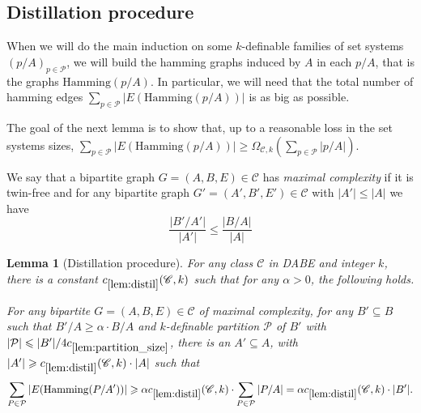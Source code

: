 \documentclass[11pt]{article}
\newtheorem{lemma}{Lemma}
\theoremstyle{definition}
\newcommand{\CC}{{\mathscr C}}
\newcommand{\inducedSS}[2]{#1/#2}%
\renewcommand{\leq}{\leqslant}
\renewcommand{\geq}{\geqslant}
\renewcommand{\ge}{\geqslant}
\newcommand{\Pp}{\mathcal{P}}
\newcommand{\remph}[1]{{\color{red} \emph{#1}}}
\newcommand{\hamming}{\mathrm{Hamming}}
\begin{document}
\subsection{Distillation procedure}
When we will do the main induction on some $k$-definable families of set systems $(\inducedSS{p}{A})_{p \in \Pp}$, we will build the hamming graphs induced by $A$ in each $\inducedSS{p}{A}$, that is the graphs $\hamming(\inducedSS{p}{A})$. In particular, we will need that the total number of hamming edges $\sum_{p \in \Pp} |E(\hamming(\inducedSS{p}{A}))|$ is as big as possible.

The goal of the next lemma is to show that, up to a reasonable loss in the set systems sizes, $\sum_{p \in \Pp} |E(\hamming(\inducedSS{p}{A}))| \ge \Omega_{\CC, k}(\sum_{p \in \Pp} |\inducedSS{p}{A}|)$.

We say that a bipartite graph $G = (A, B, E) \in \CC$ has \remph{maximal complexity} if it is twin-free and for any bipartite graph $G' = (A', B', E') \in \CC$ with $|A'| \leq |A|$ we have
\[
\frac{|B'/A'|}{|A'|} \leq \frac{|B/A|}{|A|}
\]

\begin{lemma}[Distillation procedure]\label{lem:distil}
For any class $\CC$ in DABE and integer $k$, there is a constant
$c_{\ref{lem:distil}}(\CC, k)$ such that for any $\alpha > 0$, the following holds.

For any bipartite $G = (A, B, E) \in \CC$ of maximal complexity, for any $B' \subseteq B$ such that $B'/A \geqslant \alpha \cdot B/A$ and $k$-definable partition $\Pp$ of $B'$ with $|\Pp| \leqslant |B'|/4 c_{\ref{lem:partition_size}}$,
there is an $A' \subseteq A$, with $|A'| \geq c_{\ref{lem:distil}}(\CC, k) \cdot |A|$ such that  
\[
\sum_{P \in \Pp} |E(\hamming(\inducedSS{P}{A'}))| \ge
\alpha c_{\ref{lem:distil}}(\CC, k) \cdot \sum_{P \in \Pp} |P/A| = \alpha c_{\ref{lem:distil}}(\CC, k) \cdot |B'|.
\]
\end{lemma}
\end{document}

